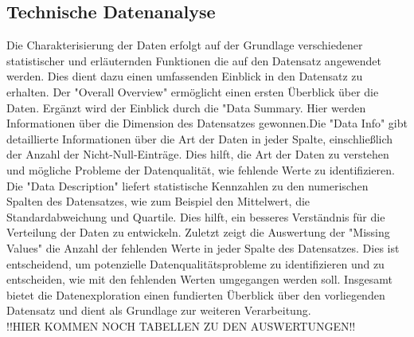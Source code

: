 \documentclass{article}
\begin{document}
\subsection{Technische Datenanalyse}
Die Charakterisierung der Daten erfolgt auf der Grundlage verschiedener statistischer und erläuternden Funktionen die auf den Datensatz angewendet werden. Dies dient dazu einen umfassenden Einblick in den Datensatz zu erhalten. Der "Overall Overview" ermöglicht einen ersten Überblick über die Daten. Ergänzt wird der Einblick durch die "Data Summary. Hier werden Informationen über die Dimension des Datensatzes gewonnen.Die "Data Info" gibt detaillierte Informationen über die Art der Daten in jeder Spalte, einschließlich der Anzahl der Nicht-Null-Einträge. Dies hilft, die Art der Daten zu verstehen und mögliche Probleme der Datenqualität, wie fehlende Werte zu identifizieren. Die "Data Description" liefert statistische Kennzahlen zu den numerischen Spalten des Datensatzes, wie zum Beispiel den Mittelwert, die Standardabweichung und Quartile. Dies hilft, ein besseres Verständnis für die
Verteilung der Daten zu entwickeln. Zuletzt zeigt die Auswertung der "Missing Values" die Anzahl der fehlenden Werte in jeder Spalte des Datensatzes. Dies ist entscheidend, um potenzielle Datenqualitätsprobleme zu identifizieren und zu entscheiden, wie mit den fehlenden Werten umgegangen werden soll. Insgesamt bietet die Datenexploration einen fundierten Überblick über den vorliegenden Datensatz und dient als Grundlage zur weiteren Verarbeitung.\\
!!HIER KOMMEN NOCH TABELLEN ZU DEN AUSWERTUNGEN!!
\end{document}
